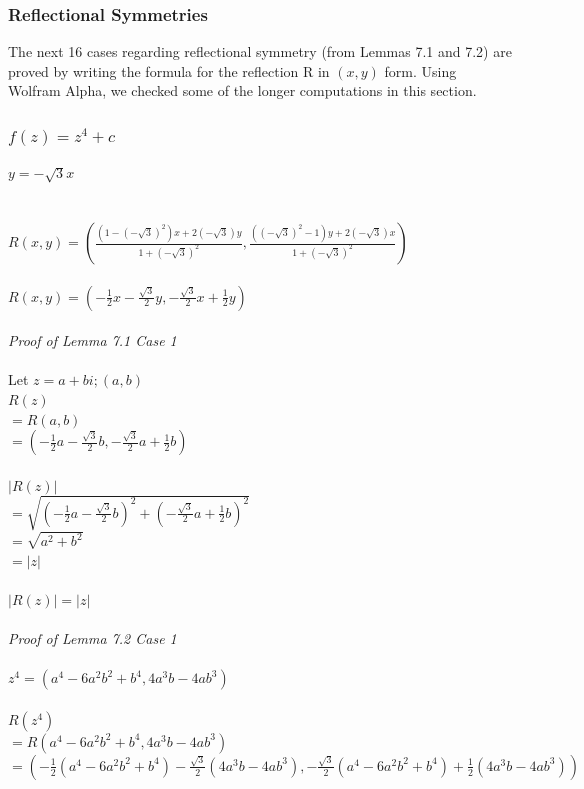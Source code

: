 \documentclass{article}
\begin{document}
\subsubsection{Reflectional Symmetries}
The next 16 cases regarding reflectional symmetry (from Lemmas 7.1 and 7.2) are proved by writing the formula for the reflection R in $(x, y)$ form. Using Wolfram Alpha, we checked some of the longer computations in this section.

\subsubsection{$f(z) = z^4 + c$}
\underline{$y=-\sqrt{3}x$}           %
\\
\\
\\$R(x,y) = (\frac{(1-(-\sqrt{3})^2)x+2(-\sqrt{3})y}{1+(-\sqrt{3})^2}, \frac{((-\sqrt{3})^2-1)y+2(-\sqrt{3})x}{1+(-\sqrt{3})^2})$
\\
\\$R(x,y) = (-\frac{1}{2}x-\frac{\sqrt{3}}{2}y, -\frac{\sqrt{3}}{2}x+\frac{1}{2}y)$
\\
\\\textit{Proof of Lemma 7.1 Case 1}
\\
\\Let $z=a+bi; (a,b)$
\\$R(z)$
\\$= R(a,b)$
\\$= (-\frac{1}{2}a-\frac{\sqrt{3}}{2}b, -\frac{\sqrt{3}}{2}a+\frac{1}{2}b)$
\\
\\$|R(z)|$
\\$= \sqrt{(-\frac{1}{2}a-\frac{\sqrt{3}}{2}b)^2 + (-\frac{\sqrt{3}}{2}a+\frac{1}{2}b)^2}$
\\$= \sqrt{a^2 + b^2}$
\\$= |z|$
\\
\\$|R(z)| = |z|$
\\
\\\textit{Proof of Lemma 7.2 Case 1}
\\
\\$z^4 = (a^4-6a^2b^2+b^4, 4a^3b-4ab^3)$
\\
\\$R(z^4)$
\\$= R(a^4-6a^2b^2+b^4, 4a^3b-4ab^3)$
\\$= (-\frac{1}{2}(a^4-6a^2b^2+b^4)-\frac{\sqrt{3}}{2}(4a^3b-4ab^3), -\frac{\sqrt{3}}{2}(a^4-6a^2b^2+b^4)+\frac{1}{2}(4a^3b-4ab^3))$
\end{document}

